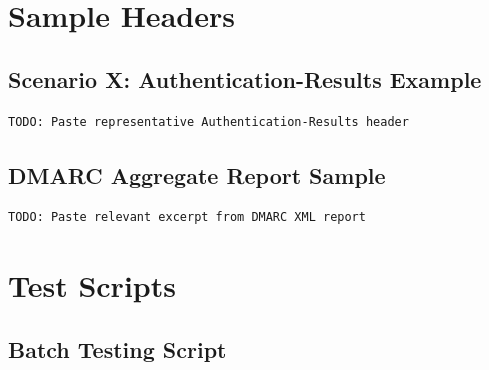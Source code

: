 \documentclass[11pt,a4paper]{article}
\begin{document}
\appendix
\section{Sample Headers}

\subsection{Scenario X: Authentication-Results Example}

\begin{lstlisting}
TODO: Paste representative Authentication-Results header
\end{lstlisting}

\subsection{DMARC Aggregate Report Sample}

\begin{lstlisting}
TODO: Paste relevant excerpt from DMARC XML report
\end{lstlisting}

\section{Test Scripts}

\subsection{Batch Testing Script}
\end{document}
